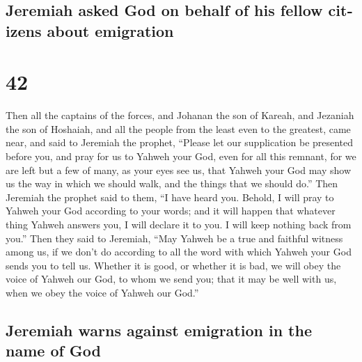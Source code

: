 \begin{paracol}{2}
\begin{otherlanguage}{english}
{\subsection{Jeremiah asked God on behalf of his fellow citizens about
emigration}\label{jeremiah-asked-god-on-behalf-of-his-fellow-citizens-about-emigration}}

\hypertarget{section-83}{%
\section{42}\label{section-83}}

 Then all the captains of the forces, and Johanan the son
of Kareah, and Jezaniah the son of Hoshaiah, and all the people from the
least even to the greatest, came near,  and said to
Jeremiah the prophet, ``Please let our supplication be presented before
you, and pray for us to Yahweh your God, even for all this remnant, for
we are left but a few of many, as your eyes see us,  that
Yahweh your God may show us the way in which we should walk, and the
things that we should do.''  Then Jeremiah the prophet
said to them, ``I have heard you. Behold, I will pray to Yahweh your God
according to your words; and it will happen that whatever thing Yahweh
answers you, I will declare it to you. I will keep nothing back from
you.''  Then they said to Jeremiah, ``May Yahweh be a true
and faithful witness among us, if we don't do according to all the word
with which Yahweh your God sends you to tell us.  Whether
it is good, or whether it is bad, we will obey the voice of Yahweh our
God, to whom we send you; that it may be well with us, when we obey the
voice of Yahweh our God.''

\hypertarget{jeremiah-warns-against-emigration-in-the-name-of-god}{%
\subsection{Jeremiah warns against emigration in the name of
God}\label{jeremiah-warns-against-emigration-in-the-name-of-god}}


\end{otherlanguage}
\end{paracol}
